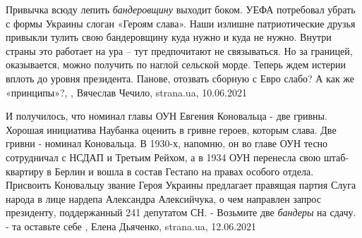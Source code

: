 Привычка всюду лепить \emph{бандеровщину} выходит боком.  УЕФА потребовал
убрать с формы Украины слоган «Героям слава».  Наши излишне патриотические
друзья привыкли тулить свою бандеровщину куда нужно и куда не нужно. Внутри
страны это работает на ура – тут предпочитают не связываться. Но за границей,
оказывается, можно получить по наглой сельской морде. Теперь ждем истерии
вплоть до уровня президента.  Панове, отозвать сборную с Евро слабо? А как же
«принципы»?,
, 
Вячеслав Чечило, strana.ua, 10.06.2021

И получилось, что номинал главы ОУН Евгения Коновальца - две гривны.  Хорошая
инициатива Наубанка оценить в гривне героев, которым слава. Две гривни -
номинал Коновальца. В 1930-х, напомню, он во главе ОУН тесно сотрудничал с
НСДАП и Третьим Рейхом, а в 1934 ОУН перенесла свою штаб-квартиру в Берлин и
вошла в состав Гестапо на правах особого отдела. Присвоить Коновальцу звание
Героя Украины предлагает правящая партия Слуга народа в лице нардепа Александра
Алексийчука, о чем направлен запрос президенту, поддержанный 241 депутатом СН.
- Возьмите две \emph{бандеры} на сдачу. - та оставьте себе
, Елена Дьяченко, strana.ua, 12.06.2021

